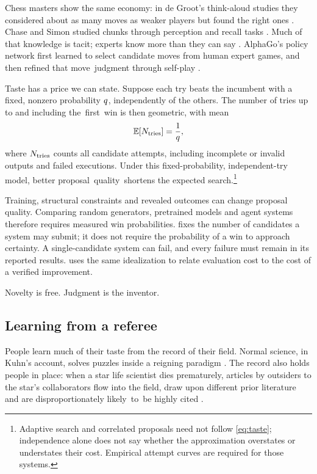 Chess masters show the same economy: in de Groot's think-aloud studies they considered about as many moves as weaker players but found the right ones \citep{degroot1965thought}. Chase and Simon studied chunks through perception and recall tasks \citep{chase1973perception}. Much of that knowledge is tacit; experts know more than they can say \citep{polanyi1966tacit}.
AlphaGo's policy network first learned to select candidate moves from human expert games,
and then refined that \mbox{move judgment} through self-play \citep{silver2016mastering}.

Taste has a price we can state. Suppose each try beats the incumbent with a fixed, nonzero probability
$q$, independently of the others. The number of tries up to and including \mbox{the first win} is then geometric, with mean
\begin{equation}
  \mathbb{E}[N_{\mathrm{tries}}] = \frac{1}{q},
  \label{eq:taste}
\end{equation}
where $N_{\mathrm{tries}}$ counts all candidate attempts, including incomplete or
invalid outputs and failed executions. Under this fixed-probability,
independent-try model, better \mbox{proposal quality shortens}
the expected search.\footnote{Adaptive search and correlated
proposals need not follow \cref{eq:taste}; independence alone does not say
whether the approximation overstates or understates their cost. Empirical
attempt curves are required for those systems.}

Training, structural constraints and revealed outcomes can change proposal
quality. Comparing random generators, pretrained models and agent systems
therefore requires measured win probabilities. \searchone{} fixes the number of candidates a system
may submit; it does not require the probability of a win to approach certainty.
A single-candidate system can fail, and every failure must remain in its
reported results.  uses the same idealization to relate
\mbox{evaluation} cost to the cost of a verified improvement.

\begin{keyidea}
Novelty is free. Judgment is the inventor.
\end{keyidea}

\subsection{Learning from a referee}\label{sub:anatomy-history}

People learn much of their taste from the record of their field. Normal science, in Kuhn's account, solves puzzles inside a reigning paradigm \citep{kuhn1962structure}. The record also holds people in place: when a star life scientist dies prematurely, articles by outsiders to the star's collaborators flow into the field, draw upon different prior literature and are disproportionately \mbox{likely to be} highly cited \citep{azoulay2019funeral}.

